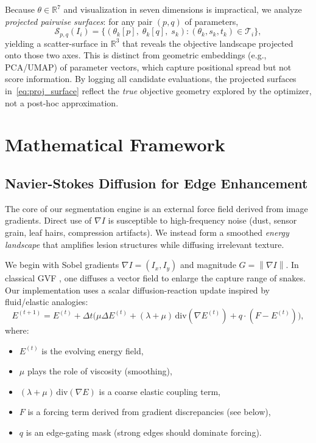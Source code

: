 \documentclass[journal]{IEEEtran}
\newcommand{\R}{\mathbb{R}}
\newcommand{\grad}{\nabla}
\newcommand{\lap}{\Delta}
\newcommand{\norm}[1]{\left\lVert #1 \right\rVert}
\begin{document}
Because $\theta\in\R^7$ and visualization in seven dimensions is impractical, we analyze \emph{projected pairwise surfaces}: for any pair $(p,q)$ of parameters,
\begin{equation}
\mathcal{S}_{p,q}(I_i) = \bigl\{(\theta_k[p],\; \theta_k[q],\; s_k) : (\theta_k, s_k, t_k) \in \mathcal{T}_i \bigr\},
\label{eq:proj_surface}
\end{equation}
yielding a scatter-surface in $\R^3$ that reveals the objective landscape projected onto those two axes. This is distinct from geometric embeddings (e.g., PCA/UMAP) of parameter vectors, which capture positional spread but not score information. By logging all candidate evaluations, the projected surfaces in~\eqref{eq:proj_surface} reflect the \emph{true} objective geometry explored by the optimizer, not a post-hoc approximation.

\section{Mathematical Framework}

\subsection{Navier-Stokes Diffusion for Edge Enhancement}
The core of our segmentation engine is an external force field derived from image gradients. Direct use of $\grad I$ is susceptible to high-frequency noise (dust, sensor grain, leaf hairs, compression artifacts). We instead form a smoothed \emph{energy landscape} that amplifies lesion structures while diffusing irrelevant texture.

We begin with Sobel gradients $\grad I = (I_x, I_y)$ and magnitude $G = \norm{\grad I}$. In classical GVF \cite{xu1998gvf}, one diffuses a vector field to enlarge the capture range of snakes. Our implementation uses a scalar diffusion-reaction update inspired by fluid/elastic analogies:
\begin{equation}
E^{(t+1)} = E^{(t)} + \Delta t \Big( \mu \lap E^{(t)} + (\lambda+\mu)\,\mathrm{div}(\grad E^{(t)}) + q\cdot (F - E^{(t)}) \Big),
\label{eq:diffusion_update}
\end{equation}
where:
\begin{itemize}
    \item $E^{(t)}$ is the evolving energy field,
    \item $\mu$ plays the role of viscosity (smoothing),
    \item $(\lambda+\mu)\,\mathrm{div}(\grad E)$ is a coarse elastic coupling term,
    \item $F$ is a forcing term derived from gradient discrepancies (see below),
    \item $q$ is an edge-gating mask (strong edges should dominate forcing).
\end{itemize}
\end{document}
